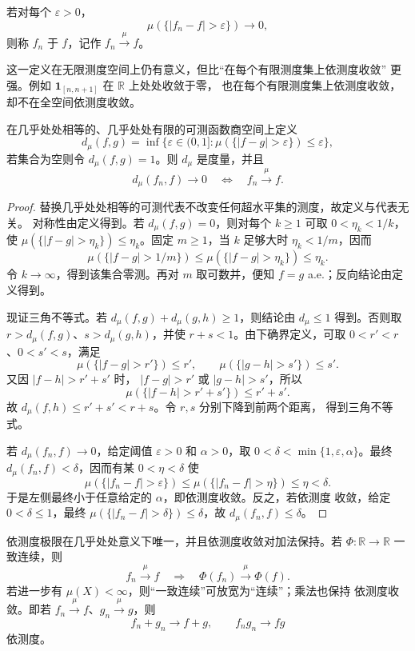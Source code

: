 \begin{definition}
若对每个 \(\varepsilon>0\)，
\[
 \mu(\{|f_n-f|>\varepsilon\})\longrightarrow0,
\]
则称 \(f_n\) 于 \(f\)，记作
\(f_n\xrightarrow{\mu}f\)。
\end{definition}

这一定义在无限测度空间上仍有意义，但比“在每个有限测度集上依测度收敛”
更强。例如 \(\mathbf1_{[n,n+1]}\) 在 \(\mathbb R\) 上处处收敛于零，
也在每个有限测度集上依测度收敛，却不在全空间依测度收敛。

\begin{proposition}[依测度收敛的度量化]
\label{prop:convergence-in-measure-metric}
在几乎处处相等的、几乎处处有限的可测函数商空间上定义
\[
 d_\mu(f,g)=\inf\{\varepsilon\in(0,1]:
   \mu(\{|f-g|>\varepsilon\})\le\varepsilon\},
\]
若集合为空则令 \(d_\mu(f,g)=1\)。则
\(d_\mu\) 是度量，并且
\[
 d_\mu(f_n,f)\to0
 \quad\Longleftrightarrow\quad
 f_n\xrightarrow{\mu}f.
\]
\end{proposition}

\begin{proof}
替换几乎处处相等的可测代表不改变任何超水平集的测度，故定义与代表无关。
对称性由定义得到。若 \(d_\mu(f,g)=0\)，则对每个 \(k\ge1\) 可取
\(0<\eta_k<1/k\)，使
\(\mu(\{|f-g|>\eta_k\})\le\eta_k\)。固定 \(m\ge1\)，当 \(k\) 足够大时
\(\eta_k<1/m\)，因而
\[
 \mu(\{|f-g|>1/m\})
 \le\mu(\{|f-g|>\eta_k\})\le\eta_k.
\]
令 \(k\to\infty\)，得到该集合零测。再对 \(m\) 取可数并，便知
\(f=g\) a.e.；反向结论由定义得到。

现证三角不等式。若
\(d_\mu(f,g)+d_\mu(g,h)\ge1\)，则结论由 \(d_\mu\le1\) 得到。否则取
\(r>d_\mu(f,g)\)、\(s>d_\mu(g,h)\)，并使 \(r+s<1\)。由下确界定义，可取
\(0<r'<r\)、\(0<s'<s\)，满足
\[
 \mu(\{|f-g|>r'\})\le r',\qquad
 \mu(\{|g-h|>s'\})\le s'.
\]
又因 \(|f-h|>r'+s'\) 时，
\(|f-g|>r'\) 或 \(|g-h|>s'\)，所以
\[
 \mu(\{|f-h|>r'+s'\})
 \le r'+s'.
\]
故 \(d_\mu(f,h)\le r'+s'<r+s\)。令 \(r,s\) 分别下降到前两个距离，
得到三角不等式。

若 \(d_\mu(f_n,f)\to0\)，给定阈值 \(\varepsilon>0\) 和
\(\alpha>0\)，取 \(0<\delta<\min\{1,\varepsilon,\alpha\}\)。最终
\(d_\mu(f_n,f)<\delta\)，因而有某
\(0<\eta<\delta\) 使
\[
 \mu(\{|f_n-f|>\varepsilon\})
 \le\mu(\{|f_n-f|>\eta\})\le\eta<\delta.
\]
于是左侧最终小于任意给定的 \(\alpha\)，即依测度收敛。反之，若依测度
收敛，给定 \(0<\delta\le1\)，最终
\(\mu(\{|f_n-f|>\delta\})\le\delta\)，故
\(d_\mu(f_n,f)\le\delta\)。
\end{proof}

\begin{proposition}
\label{prop:measure-limit-unique}
依测度极限在几乎处处意义下唯一，并且依测度收敛对加法保持。若
\(\Phi:\mathbb R\to\mathbb R\) 一致连续，则
\[
 f_n\xrightarrow{\mu}f
 \quad\Longrightarrow\quad
 \Phi(f_n)\xrightarrow{\mu}\Phi(f).
\]
若进一步有 \(\mu(X)<\infty\)，则“一致连续”可放宽为“连续”；乘法也保持
依测度收敛。即若 \(f_n\xrightarrow{\mu}f\)、\(g_n\xrightarrow{\mu}g\)，则
\[
 f_n+g_n\to f+g,\qquad f_ng_n\to fg
\]
依测度。
\end{proposition}

